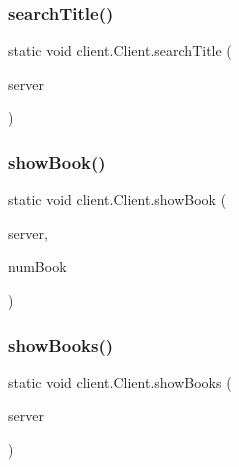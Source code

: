 \mbox{\label{classclient_1_1_client_afb1d6e6867ef984522fd421609af72d0}} 
\subsubsection{\texorpdfstring{search\+Title()}{searchTitle()}}
{\footnotesize\ttfamily static void client.\+Client.\+search\+Title (\begin{DoxyParamCaption}\item[{\hyperlink{interfaceserver_1_1remote_1_1_i_remote}{I\+Remote}}]{server }\end{DoxyParamCaption})\hspace{0.3cm}{\ttfamily [static]}}

\mbox{\label{classclient_1_1_client_ab3d8c13b4e7328d94819a5300e3c5743}} 
\subsubsection{\texorpdfstring{show\+Book()}{showBook()}}
{\footnotesize\ttfamily static void client.\+Client.\+show\+Book (\begin{DoxyParamCaption}\item[{\hyperlink{interfaceserver_1_1remote_1_1_i_remote}{I\+Remote}}]{server,  }\item[{int}]{num\+Book }\end{DoxyParamCaption})\hspace{0.3cm}{\ttfamily [static]}}

\mbox{\label{classclient_1_1_client_a7ff06b01e82b762056fc7a56e7e58d3d}} 
\subsubsection{\texorpdfstring{show\+Books()}{showBooks()}}
{\footnotesize\ttfamily static void client.\+Client.\+show\+Books (\begin{DoxyParamCaption}\item[{\hyperlink{interfaceserver_1_1remote_1_1_i_remote}{I\+Remote}}]{server }\end{DoxyParamCaption})\hspace{0.3cm}{\ttfamily [static]}}

